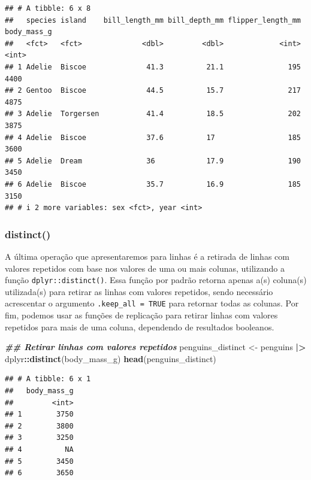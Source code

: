 \documentclass[
]{article}
\newenvironment{Shaded}{\begin{snugshade}}{\end{snugshade}}
\newcommand{\DocumentationTok}[1]{\textcolor[rgb]{0.56,0.35,0.01}{\textbf{\textit{#1}}}}
\newcommand{\FunctionTok}[1]{\textcolor[rgb]{0.13,0.29,0.53}{\textbf{#1}}}
\newcommand{\NormalTok}[1]{#1}
\newcommand{\OtherTok}[1]{\textcolor[rgb]{0.56,0.35,0.01}{#1}}
\newcommand{\SpecialCharTok}[1]{\textcolor[rgb]{0.81,0.36,0.00}{\textbf{#1}}}
\begin{document}
\begin{verbatim}
## # A tibble: 6 x 8
##   species island    bill_length_mm bill_depth_mm flipper_length_mm body_mass_g
##   <fct>   <fct>              <dbl>         <dbl>             <int>       <int>
## 1 Adelie  Biscoe              41.3          21.1               195        4400
## 2 Gentoo  Biscoe              44.5          15.7               217        4875
## 3 Adelie  Torgersen           41.4          18.5               202        3875
## 4 Adelie  Biscoe              37.6          17                 185        3600
## 5 Adelie  Dream               36            17.9               190        3450
## 6 Adelie  Biscoe              35.7          16.9               185        3150
## # i 2 more variables: sex <fct>, year <int>
\end{verbatim}

\hypertarget{distinct}{%
\subsubsection{distinct()}\label{distinct}}

A última operação que apresentaremos para linhas é a retirada de linhas com valores repetidos com base nos valores de uma ou mais colunas, utilizando a função \texttt{dplyr::distinct()}. Essa função por padrão retorna apenas a(s) coluna(s) utilizada(s) para retirar as linhas com valores repetidos, sendo necessário acrescentar o argumento \texttt{.keep\_all\ =\ TRUE} para retornar todas as colunas. Por fim, podemos usar as funções de replicação para retirar linhas com valores repetidos para mais de uma coluna, dependendo de resultados booleanos.

\begin{Shaded}
\begin{Highlighting}[]
\DocumentationTok{\#\# Retirar linhas com valores repetidos}
\NormalTok{penguins\_distinct }\OtherTok{\textless{}{-}}\NormalTok{ penguins }\SpecialCharTok{|\textgreater{}} 
\NormalTok{    dplyr}\SpecialCharTok{::}\FunctionTok{distinct}\NormalTok{(body\_mass\_g)}
\FunctionTok{head}\NormalTok{(penguins\_distinct)}
\end{Highlighting}
\end{Shaded}

\begin{verbatim}
## # A tibble: 6 x 1
##   body_mass_g
##         <int>
## 1        3750
## 2        3800
## 3        3250
## 4          NA
## 5        3450
## 6        3650
\end{verbatim}
\end{document}
